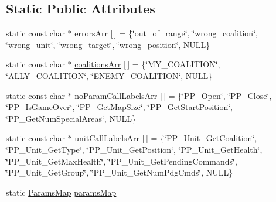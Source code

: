 \subsection*{Static Public Attributes}
\begin{DoxyCompactItemize}
\item 
static const char $\ast$ \hyperlink{class_call_a9b4594fe997fce2b0155af42d47af07a}{errors\+Arr} \mbox{[}$\,$\mbox{]} = \{\char`\"{}out\+\_\+of\+\_\+range\char`\"{}, \char`\"{}wrong\+\_\+coalition\char`\"{}, \char`\"{}wrong\+\_\+unit\char`\"{}, \char`\"{}wrong\+\_\+target\char`\"{}, \char`\"{}wrong\+\_\+position\char`\"{}, N\+U\+LL\}
\item 
static const char $\ast$ \hyperlink{class_call_a69386ad6806856e50ad09edf31998dc2}{coalitions\+Arr} \mbox{[}$\,$\mbox{]} = \{\char`\"{}M\+Y\+\_\+\+C\+O\+A\+L\+I\+T\+I\+ON\char`\"{}, \char`\"{}A\+L\+L\+Y\+\_\+\+C\+O\+A\+L\+I\+T\+I\+ON\char`\"{}, \char`\"{}E\+N\+E\+M\+Y\+\_\+\+C\+O\+A\+L\+I\+T\+I\+ON\char`\"{}, N\+U\+LL\}
\item 
static const char $\ast$ \hyperlink{class_call_a502f84377bff9a869d6c0349408a8cd1}{no\+Param\+Call\+Labels\+Arr} \mbox{[}$\,$\mbox{]} = \{\char`\"{}P\+P\+\_\+\+Open\char`\"{}, \char`\"{}P\+P\+\_\+\+Close\char`\"{}, \char`\"{}P\+P\+\_\+\+Is\+Game\+Over\char`\"{}, \char`\"{}P\+P\+\_\+\+Get\+Map\+Size\char`\"{}, \char`\"{}P\+P\+\_\+\+Get\+Start\+Position\char`\"{}, \char`\"{}P\+P\+\_\+\+Get\+Num\+Special\+Areas\char`\"{}, N\+U\+LL\}
\item 
static const char $\ast$ \hyperlink{class_call_a7f62a26228ad25563c7dfbacda6f9759}{unit\+Call\+Labels\+Arr} \mbox{[}$\,$\mbox{]} = \{\char`\"{}P\+P\+\_\+\+Unit\+\_\+\+Get\+Coalition\char`\"{}, \char`\"{}P\+P\+\_\+\+Unit\+\_\+\+Get\+Type\char`\"{}, \char`\"{}P\+P\+\_\+\+Unit\+\_\+\+Get\+Position\char`\"{}, \char`\"{}P\+P\+\_\+\+Unit\+\_\+\+Get\+Health\char`\"{}, \char`\"{}P\+P\+\_\+\+Unit\+\_\+\+Get\+Max\+Health\char`\"{}, \char`\"{}P\+P\+\_\+\+Unit\+\_\+\+Get\+Pending\+Commands\char`\"{}, \char`\"{}P\+P\+\_\+\+Unit\+\_\+\+Get\+Group\char`\"{}, \char`\"{}P\+P\+\_\+\+Unit\+\_\+\+Get\+Num\+Pdg\+Cmds\char`\"{}, N\+U\+LL\}
\item 
static \hyperlink{class_params_map}{Params\+Map} \hyperlink{class_call_ab91ad28c9446ceec253123d66b23f81c}{params\+Map}
\end{DoxyCompactItemize}
